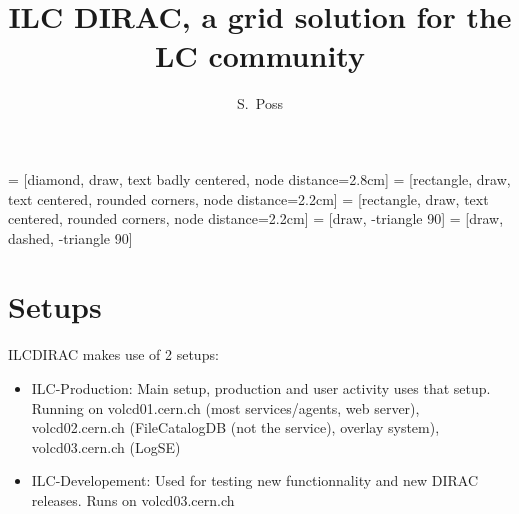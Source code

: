 \documentclass[a4paper,12pt]{article}
\title{ILC DIRAC, a grid solution for the LC community}
\author{S.~Poss}
\begin{document}
 = [diamond, draw, text badly centered, node distance=2.8cm]
 = [rectangle, draw, text centered, rounded corners, node distance=2.2cm]
 = [rectangle, draw, text centered, rounded corners, node distance=2.2cm]
 = [draw, -triangle 90]
 = [draw, dashed, -triangle 90]

\maketitle
{}

\tableofcontents

\section{Setups}
ILCDIRAC makes use of 2 setups:
\begin{itemize}
  \item ILC-Production: Main setup, production and user activity uses that
  setup. Running on volcd01.cern.ch (most services/agents, web server),
  volcd02.cern.ch (FileCatalogDB (not the service), overlay system), volcd03.cern.ch (LogSE)
  \item ILC-Developement: Used for testing new functionnality and new DIRAC
  releases. Runs on volcd03.cern.ch
\end{itemize}
\end{document}

